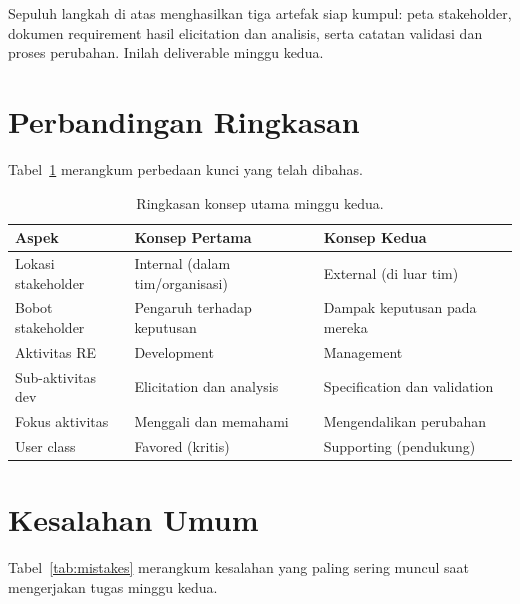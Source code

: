 \documentclass[11pt,a4paper]{article}
\begin{document}
Sepuluh langkah di atas menghasilkan tiga artefak siap kumpul: peta stakeholder, dokumen requirement hasil elicitation dan analisis, serta catatan validasi dan proses perubahan. Inilah deliverable minggu kedua.

\section{Perbandingan Ringkasan}

Tabel~\ref{tab:summary} merangkum perbedaan kunci yang telah dibahas.

\begin{table}[H]
	\centering
	\caption{Ringkasan konsep utama minggu kedua.}
	\label{tab:summary}
	\footnotesize
	\begin{tabularx}{\textwidth}{l X X}
		\toprule
		Aspek              & Konsep Pertama                  & Konsep Kedua                 \\
		\midrule
		Lokasi stakeholder & Internal (dalam tim/organisasi) & External (di luar tim)       \\
		Bobot stakeholder  & Pengaruh terhadap keputusan     & Dampak keputusan pada mereka \\
		Aktivitas RE       & Development                     & Management                   \\
		Sub-aktivitas dev  & Elicitation dan analysis        & Specification dan validation \\
		Fokus aktivitas    & Menggali dan memahami           & Mengendalikan perubahan      \\
		User class         & Favored (kritis)                & Supporting (pendukung)       \\
		\bottomrule
	\end{tabularx}
\end{table}

\section{Kesalahan Umum}

Tabel~\ref{tab:mistakes} merangkum kesalahan yang paling sering muncul saat mengerjakan tugas minggu kedua.
\end{document}
